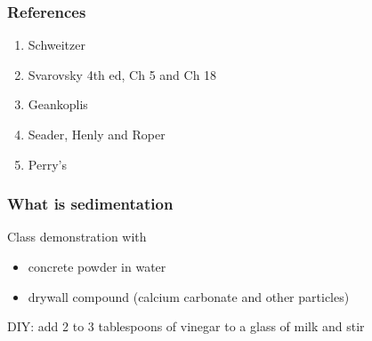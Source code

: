 \begin{comment}
And Perry's section 22.5.7

edimentation Tanks These tanks are an integral part of any activated-sludge system. It is essential to separate the suspended solids from the treated liquid if a high-quality effluent is to be produced. Circular sedimentation tanks with various types of hydraulic sludge collectors have become the standard secondary sedimentation system. Square tanks have been used with commonwall construction for compact design with multiple tanks. Most secondary sedimentation tanks use center-feed inlets and peripheral-weir outlets. Recently, efforts have been made to employ peripheral inlets with submerged-orifice flow controllers and either center-weir outlets or peripheral-weir outlets adjacent to the peripheral-inlet channel.

\end{comment}

\begin{frame}\frametitle{References}
	\begin{enumerate}
		\item	Schweitzer
		\item	Svarovsky 4th ed, Ch 5 and Ch 18
		\item	Geankoplis
		\item	Seader, Henly and Roper
		\item	Perry's
		
	\end{enumerate}
\end{frame}

\begin{frame}\frametitle{What is sedimentation}
	Class demonstration with
	\begin{itemize}
		\item	concrete powder in water
		\item	drywall compound (calcium carbonate and other particles)
	\end{itemize}

	\vspace{12pt}
	DIY: add 2 to 3 tablespoons of vinegar to a glass of milk and stir	
\end{frame}

